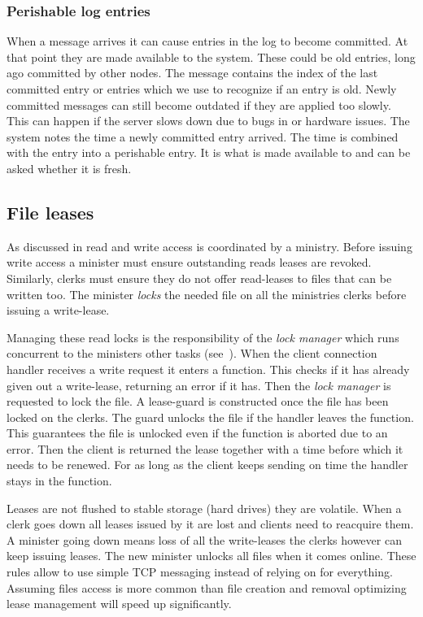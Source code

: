 \subsubsection*{Perishable log entries}
When a \raft{} message arrives it can cause entries in the log to become committed. At that point they are made available to the system. These could be old entries, long ago committed by other nodes. The message contains the index of the last committed entry or entries which we use to recognize if an entry is old. Newly committed messages can still become outdated if they are applied too slowly. This can happen if the server slows down due to bugs in \name{} or hardware issues. The system notes the time a newly committed entry arrived. The time is combined with the entry into a perishable entry. It is what is made available to \name{} and can be asked whether it is fresh.

\subsection{File leases} \label{sec:impl_leases}
As discussed in  read and write access is coordinated by a ministry. Before issuing write access a minister must ensure outstanding reads leases are revoked. Similarly, clerks must ensure they do not offer read-leases to files that can be written too. The minister \emph{locks} the needed file on all the ministries clerks before issuing a write-lease. 

Managing these read locks is the responsibility of the \textit{lock manager} which runs concurrent to the ministers other tasks (see~). When the client connection handler \straightTasksLeg{} receives a write request it enters a  function. This checks if it has already given out a write-lease, returning an error if it has. Then the \textit{lock manager} is requested to lock the file. A lease-guard is constructed once the file has been locked on the clerks. The guard unlocks the file if the handler leaves the  function. This guarantees the file is unlocked even if the function is aborted due to an error. Then the client is returned the lease together with a time before which it needs to be renewed. For as long as the client keeps sending  on time the handler stays in the  function.

Leases are not flushed to stable storage (hard drives) they are volatile. When a clerk goes down all leases issued by it are lost and clients need to reacquire them. A minister going down means loss of all the write-leases the clerks however can keep issuing leases. The new minister unlocks all files when it comes online. These rules allow \name{} to use simple TCP messaging instead of relying on \raft{} for everything. Assuming files access is more common than file creation and removal optimizing lease management will speed up \name{} significantly.
%
